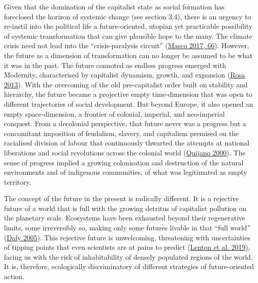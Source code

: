 \documentclass[a4paper, nobind]{templates/ociamthesis}
\begin{document}
Given that the domination of the capitalist state as social formation has foreclosed the horizon of systemic change (see section 3.4), there is an urgency to re-instil into the political life a future-oriented, utopian yet practicable possibility of systemic transformation that can give plausible hope to the many. The climate crisis need not lead into the ``crisis-paralysis circuit'' (\protect\hyperlink{ref-masco_crisis_2017}{Masco 2017, 66}). However, the future as a dimension of transformation can no longer be assumed to be what it was in the past. The future connoted as endless progress emerged with Modernity, characterised by capitalist dynamism, growth, and expansion (\protect\hyperlink{ref-rosa_social_2013}{Rosa 2013}). With the overcoming of the old pre-capitalist order built on stability and hierarchy, the future became a projective empty time-dimension that was open to different trajectories of social development. But beyond Europe, it also opened an empty space-dimension, a frontier of colonial, imperial, and neo-imperial conquest. From a decolonial perspective, that future never was a progress but a concomitant imposition of feudalism, slavery, and capitalism premised on the racialised division of labour that continuously thwarted the attempts at national liberations and social revolutions across the colonial world (\protect\hyperlink{ref-quijano_coloniality_2000}{Quijano 2000}). The sense of progress implied a growing colonisation and destruction of the natural environments and of indigenous communities, of what was legitimated as empty territory.

The concept of the future in the present is radically different. It is a rejective future of a world that is full with the growing detritus of capitalist pollution on the planetary scale. Ecosystems have been exhausted beyond their regenerative limits, some irreversibly so, making only some futures livable in that ``full world'' (\protect\hyperlink{ref-daly_economics_2005}{Daly 2005}). This rejective future is unwelcoming, threatening with uncertainties of tipping points that even scientists are at pains to predict (\protect\hyperlink{ref-lenton_climate_2019}{Lenton et al. 2019}), facing us with the risk of inhabitability of densely populated regions of the world. It is, therefore, ecologically discriminatory of different strategies of future-oriented action.
\end{document}
